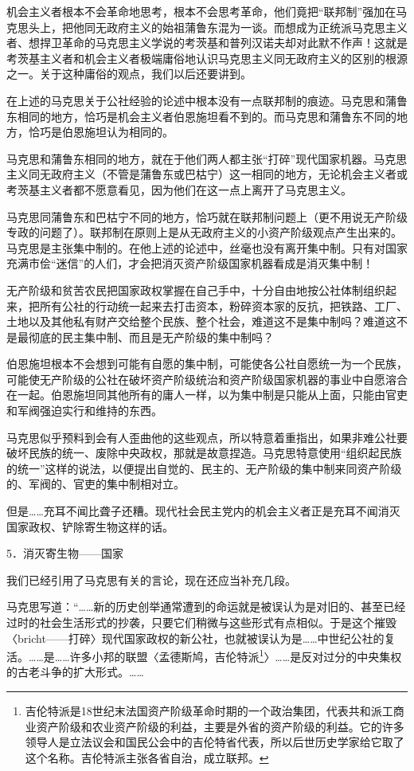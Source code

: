 \documentclass[UTF8, 12pt, a4paper]{ctexrep}
\begin{document}
机会主义者根本不会革命地思考，根本不会思考革命，他们竟把“联邦制”强加在马克思头上，把他同无政府主义的始祖蒲鲁东混为一谈。而想成为正统派马克思主义者、想捍卫革命的马克思主义学说的考茨基和普列汉诺夫却对此默不作声！这就是考茨基主义者和机会主义者极端庸俗地认识马克思主义同无政府主义的区别的根源之一。关于这种庸俗的观点，我们以后还要讲到。

在上述的马克思关于公社经验的论述中根本没有一点联邦制的痕迹。马克思和蒲鲁东相同的地方，恰巧是机会主义者伯恩施坦看不到的。而马克思和蒲鲁东不同的地方，恰巧是伯恩施坦认为相同的。

马克思和蒲鲁东相同的地方，就在于他们两人都主张“打碎”现代国家机器。马克思主义同无政府主义（不管是蒲鲁东或巴枯宁）这一相同的地方，无论机会主义者或考茨基主义者都不愿意看见，因为他们在这一点上离开了马克思主义。

马克思同蒲鲁东和巴枯宁不同的地方，恰巧就在联邦制问题上（更不用说无产阶级专政的问题了）。联邦制在原则上是从无政府主义的小资产阶级观点产生出来的。马克思是主张集中制的。在他上述的论述中，丝毫也没有离开集中制。只有对国家充满市侩“迷信”的人们，才会把消灭资产阶级国家机器看成是消灭集中制！

无产阶级和贫苦农民把国家政权掌握在自己手中，十分自由地按公社体制组织起来，把所有公社的行动统一起来去打击资本，粉碎资本家的反抗，把铁路、工厂、土地以及其他私有财产交给整个民族、整个社会，难道这不是集中制吗？难道这不是最彻底的民主集中制、而且是无产阶级的集中制吗？

伯恩施坦根本不会想到可能有自愿的集中制，可能使各公社自愿统一为一个民族，可能使无产阶级的公社在破坏资产阶级统治和资产阶级国家机器的事业中自愿溶合在一起。伯恩施坦同其他所有的庸人一样，以为集中制是只能从上面，只能由官吏和军阀强迫实行和维持的东西。

马克思似乎预料到会有人歪曲他的这些观点，所以特意着重指出，如果非难公社要破坏民族的统一、废除中央政权，那就是故意捏造。马克思特意使用“组织起民族的统一”这样的说法，以便提出自觉的、民主的、无产阶级的集中制来同资产阶级的、军阀的、官吏的集中制相对立。

但是……充耳不闻比聋子还糟。现代社会民主党内的机会主义者正是充耳不闻消灭国家政权、铲除寄生物这样的话。

5．消灭寄生物——国家

我们已经引用了马克思有关的言论，现在还应当补充几段。

马克思写道：“……新的历史创举通常遭到的命运就是被误认为是对旧的、甚至已经过时的社会生活形式的抄袭，只要它们稍微与这些形式有点相似。于是这个摧毁〈bricht——打碎〉现代国家政权的新公社，也就被误认为是……中世纪公社的复活。……是……许多小邦的联盟〈孟德斯鸠，吉伦特派\footnote{吉伦特派是18世纪末法国资产阶级革命时期的一个政治集团，代表共和派工商业资产阶级和农业资产阶级的利益，主要是外省的资产阶级的利益。它的许多领导人是立法议会和国民公会中的吉伦特省代表，所以后世历史学家给它取了这个名称。吉伦特派主张各省自治，成立联邦。}〉……是反对过分的中央集权的古老斗争的扩大形式。……
\end{document}
